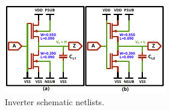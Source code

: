 
\begin{figure}[h]
	\centering
	\includegraphics[width=\columnwidth]{./figures/IVX4.pdf}
	\caption{Inverter schematic netlists.}
	\label{ivxbufmos}
\end{figure}
